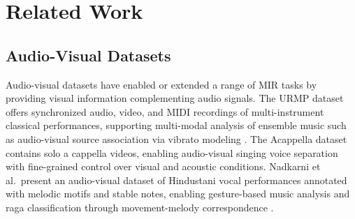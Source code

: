 \documentclass{article}
\begin{document}





\section{Related Work}
\subsection{Audio-Visual Datasets}
Audio-visual datasets have enabled or extended a range of MIR tasks by providing visual information complementing audio signals. The URMP dataset \cite{TMM18Li} offers synchronized audio, video, and MIDI recordings of multi-instrument classical performances, supporting multi-modal analysis of ensemble music such as audio-visual source association via vibrato modeling \cite{SMC17Li}. The Acappella dataset \cite{BMVC21Montesinos} contains solo a cappella videos, enabling audio-visual singing voice separation with fine-grained control over visual and acoustic conditions. Nadkarni et al.\ present an audio-visual dataset of Hindustani vocal performances annotated with melodic motifs and stable notes, enabling gesture-based music analysis and raga classification through movement-melody correspondence \cite{TISMIR24Nadkarni}.
\end{document}
